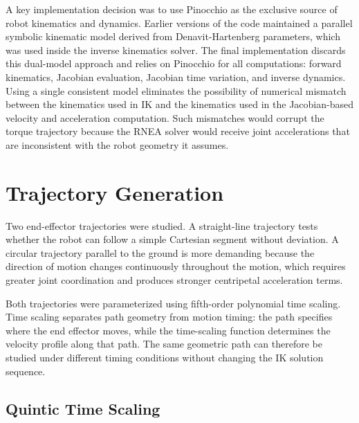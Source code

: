 \documentclass[12pt,a4paper]{article}
\begin{document}
A key implementation decision was to use Pinocchio as the exclusive source of robot
kinematics and dynamics. Earlier versions of the code maintained a parallel symbolic kinematic
model derived from Denavit-Hartenberg parameters, which was used inside the inverse kinematics
solver. The final implementation discards this dual-model approach and relies on Pinocchio for
all computations: forward kinematics, Jacobian evaluation, Jacobian time variation, and inverse
dynamics. Using a single consistent model eliminates the possibility of numerical mismatch
between the kinematics used in IK and the kinematics used in the Jacobian-based velocity and
acceleration computation. Such mismatches would corrupt the torque trajectory because the RNEA
solver would receive joint accelerations that are inconsistent with the robot geometry it
assumes.

\section{Trajectory Generation}

Two end-effector trajectories were studied. A straight-line trajectory tests whether the robot
can follow a simple Cartesian segment without deviation. A circular trajectory parallel to the
ground is more demanding because the direction of motion changes continuously throughout the
motion, which requires greater joint coordination and produces stronger centripetal acceleration
terms.

Both trajectories were parameterized using fifth-order polynomial time scaling. Time scaling
separates path geometry from motion timing: the path specifies where the end effector moves,
while the time-scaling function determines the velocity profile along that path. The same
geometric path can therefore be studied under different timing conditions without changing
the IK solution sequence.

\subsection{Quintic Time Scaling}
\end{document}
